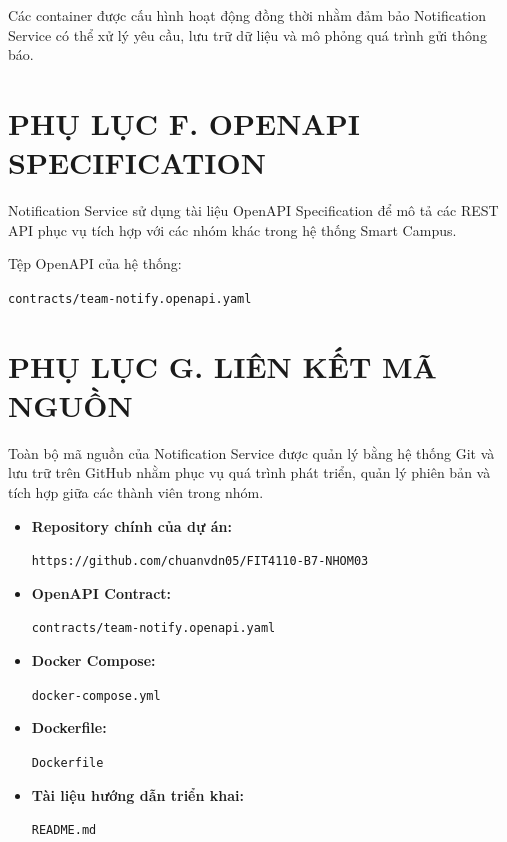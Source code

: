 Các container được cấu hình hoạt động đồng thời nhằm đảm bảo Notification Service có thể xử lý yêu cầu, lưu trữ dữ liệu và mô phỏng quá trình gửi thông báo.

\section*{PHỤ LỤC F. OPENAPI SPECIFICATION}

Notification Service sử dụng tài liệu OpenAPI Specification để mô tả các REST API phục vụ tích hợp với các nhóm khác trong hệ thống Smart Campus.

Tệp OpenAPI của hệ thống:

\begin{center}

\texttt{contracts/team-notify.openapi.yaml}

\end{center}

\section*{PHỤ LỤC G. LIÊN KẾT MÃ NGUỒN}

Toàn bộ mã nguồn của Notification Service được quản lý bằng hệ thống Git và lưu trữ trên GitHub nhằm phục vụ quá trình phát triển, quản lý phiên bản và tích hợp giữa các thành viên trong nhóm.

\begin{itemize}

\item \textbf{Repository chính của dự án:}

\texttt{https://github.com/chuanvdn05/FIT4110-B7-NHOM03}

\item \textbf{OpenAPI Contract:}

\texttt{contracts/team-notify.openapi.yaml}

\item \textbf{Docker Compose:}

\texttt{docker-compose.yml}

\item \textbf{Dockerfile:}

\texttt{Dockerfile}

\item \textbf{Tài liệu hướng dẫn triển khai:}

\texttt{README.md}

\end{itemize}


